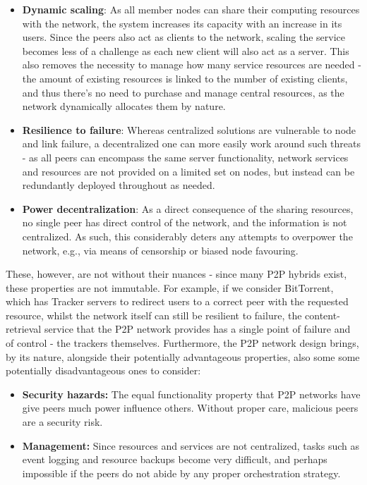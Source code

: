 \begin{itemize}
    \item \textbf{Dynamic scaling}: As all member nodes can share their computing resources with the network, the system increases its capacity with an increase in its users.
        Since the peers also act as clients to the network, scaling the service becomes less of a challenge as each new client will also act as a server.
        This also removes the necessity to manage how many service resources are needed - the amount of existing resources is linked to the number of existing clients, and thus there's no need to purchase and manage central resources, as the network dynamically allocates them by nature.
    \item \textbf{Resilience to failure}: Whereas centralized solutions are vulnerable to node and link failure, a decentralized one can more easily work around such threats - as all peers can encompass the same server functionality, network services and resources are not provided on a limited set on nodes, but instead can be redundantly deployed throughout as needed.
    \item \textbf{Power decentralization}: As a direct consequence of the sharing resources, no single peer has direct control of the network, and the information is not centralized.
        As such, this considerably deters any attempts to overpower the network, e.g., via means of censorship or biased node favouring.
\end{itemize}

    These, however, are not without their nuances - since many P2P hybrids exist, these properties are not immutable.
    For example, if we consider BitTorrent, which has Tracker servers to redirect users to a correct peer with the requested resource, whilst the network itself can still be resilient to failure, the content-retrieval service that the P2P network provides has a single point of failure and of control - the trackers themselves.
    Furthermore, the P2P network design brings, by its nature, alongside their potentially advantageous properties, also some some potentially disadvantageous ones to consider:

\begin{itemize}
    \item \textbf{Security hazards:} The equal functionality property that P2P networks have give peers much power influence others.
        Without proper care, malicious peers are a security risk.
    \item \textbf{Management:} Since resources and services are not centralized, tasks such as event logging and resource backups become very difficult, and perhaps impossible if the peers do not abide by any proper orchestration strategy.
\end{itemize}

